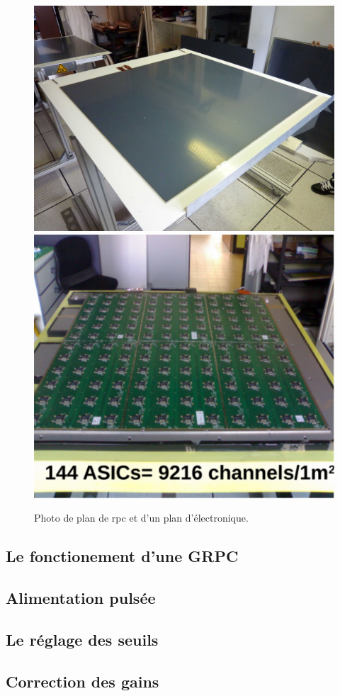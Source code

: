 \begin{figure}[!h]
  \begin{center}
    \includegraphics[width=.47\textwidth]{SDHCAL/figs/aLayer.jpg}
    \includegraphics[width=.4\textwidth]{SDHCAL/figs/layer_electronic2.pdf}
    \caption{Photo de plan de rpc et d'un plan d'électronique.}
    \label{fig:layer}
  \end{center}
\end{figure}

\subsection{Le fonctionement d'une GRPC}

\subsection{Alimentation pulsée}

\subsection{Le réglage des seuils}

\subsection{Correction des gains}


